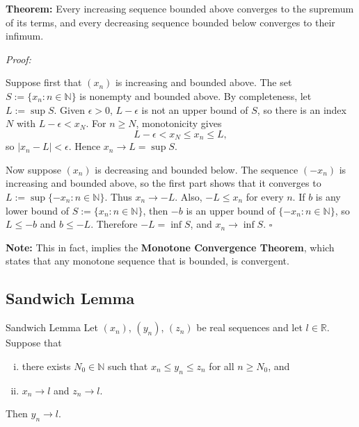 \documentclass[a4paper,11pt,abstracton]{scrartcl}
\newcommand{\RR}{\mathbb{R}}
\newcommand{\NN}{\mathbb{N}}
\theoremstyle{dotlessP}
\theoremstyle{dotlessS}
\theoremstyle{remark}
\theoremstyle{definition}
\begin{document}
\begin{problem_box}
\textbf{Theorem:}
Every increasing sequence bounded above converges to the supremum of its
terms, and every decreasing sequence bounded below converges to their
infimum.
\end{problem_box}

\begin{claim_box}
\textit{Proof:}

Suppose first that $(x_n)$ is increasing and bounded above. The set
$S:=\{x_n:n\in\NN\}$ is nonempty and bounded above. By completeness,
let $L:=\sup S$. Given $\epsilon>0$, $L-\epsilon$ is not an upper bound
of $S$, so there is an index $N$ with $L-\epsilon<x_N$. For $n\ge N$,
monotonicity gives
\[
    L-\epsilon<x_N\le x_n\le L,
\]
so $|x_n-L|<\epsilon$. Hence $x_n\to L=\sup S$.

Now suppose $(x_n)$ is decreasing and bounded below. The sequence
$(-x_n)$ is increasing and bounded above, so the first part shows that
it converges to $L:=\sup\{-x_n:n\in\NN\}$. Thus $x_n\to-L$. Also,
$-L\le x_n$ for every $n$. If $b$ is any lower bound of
$S:=\{x_n:n\in\NN\}$, then $-b$ is an upper bound of
$\{-x_n:n\in\NN\}$, so $L\le-b$ and $b\le-L$. Therefore
$-L=\inf S$, and $x_n\to\inf S$.
\hfill$\square$
\end{claim_box}

\textbf{Note:} This in fact, implies the \textbf{Monotone Convergence Theorem}, which states that any monotone sequence that is bounded, is convergent.

\subsection{Sandwich Lemma}

\begin{mainbox}{Sandwich Lemma}
Let $(x_n)$, $(y_n)$, $(z_n)$ be real sequences and let $l\in\RR$. Suppose that
\begin{enumerate}[(i)]
    \item there exists $N_0\in\NN$ such that $x_n\le y_n\le z_n$ for all $n\ge N_0$, and
    \item $x_n\to l$ and $z_n\to l$.
\end{enumerate}
Then $y_n\to l$.
\end{mainbox}
\end{document}
